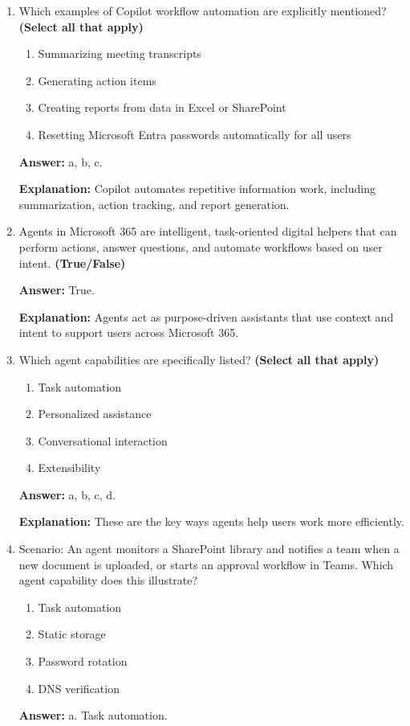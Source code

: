 \documentclass[10pt]{article}
\begin{document}
\begin{enumerate}[leftmargin=*]
\textbf{Explanation:} Content generation examples are given for Word, PowerPoint, and Outlook.

\item Which examples of Copilot workflow automation are explicitly mentioned? \textbf{(Select all that apply)}
\begin{enumerate}[label=\alph*., leftmargin=1.5em]
\item Summarizing meeting transcripts
\item Generating action items
\item Creating reports from data in Excel or SharePoint
\item Resetting Microsoft Entra passwords automatically for all users
\end{enumerate}
\textbf{Answer:} a, b, c.

\textbf{Explanation:} Copilot automates repetitive information work, including summarization, action tracking, and report generation.

\item Agents in Microsoft 365 are intelligent, task-oriented digital helpers that can perform actions, answer questions, and automate workflows based on user intent. \textbf{(True/False)}

\textbf{Answer:} True.

\textbf{Explanation:} Agents act as purpose-driven assistants that use context and intent to support users across Microsoft 365.

\item Which agent capabilities are specifically listed? \textbf{(Select all that apply)}
\begin{enumerate}[label=\alph*., leftmargin=1.5em]
\item Task automation
\item Personalized assistance
\item Conversational interaction
\item Extensibility
\end{enumerate}
\textbf{Answer:} a, b, c, d.

\textbf{Explanation:} These are the key ways agents help users work more efficiently.

\item Scenario: An agent monitors a SharePoint library and notifies a team when a new document is uploaded, or starts an approval workflow in Teams. Which agent capability does this illustrate?
\begin{enumerate}[label=\alph*., leftmargin=1.5em]
\item Task automation
\item Static storage
\item Password rotation
\item DNS verification
\end{enumerate}
\textbf{Answer:} a. Task automation.


\end{enumerate}
\end{document}
